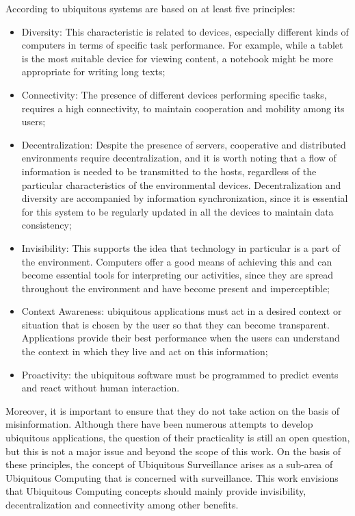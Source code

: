 According to \cite{Hansmann2001} ubiquitous systems are based on at least five principles:
\begin{itemize}

\item Diversity: This characteristic is related to devices, especially different kinds of computers in terms of specific task performance. For example, while a tablet is the most suitable device for viewing content, a notebook might be more appropriate for writing long texts;

\item Connectivity: The presence of different devices performing specific tasks, requires a high connectivity, to maintain cooperation and mobility among its users;

\item Decentralization: Despite the presence of servers, cooperative and distributed environments require decentralization, and it is worth noting that a flow of information is needed to be transmitted to the hosts, regardless of the particular characteristics of the environmental devices. Decentralization and diversity are accompanied by information synchronization, since it is essential for this system to be regularly updated in all the devices to maintain data consistency;

\item Invisibility: This supports the idea that technology in particular is a part of the environment. Computers offer a good means of achieving this and can become essential tools for interpreting our activities, since they are spread throughout the environment and have become present and imperceptible;

\item Context Awareness: ubiquitous applications must act in a desired context or situation that is chosen by the user so that they can become transparent. Applications provide their best performance when the users can understand the context in which they live and act on this information;

\item Proactivity: the ubiquitous software must be programmed to predict events and react without human interaction. 
\end{itemize}
Moreover, it is important to ensure that they do not take action on the basis of misinformation.
Although there have been numerous attempts to develop ubiquitous applications, the question of their practicality is still an open question, but this is not a major issue and beyond the scope of this work. On the basis of these principles, the concept of Ubiquitous Surveillance arises \cite{Orwel42} as a sub-area of Ubiquitous Computing that is concerned with surveillance. This work envisions that Ubiquitous Computing concepts should mainly provide invisibility, decentralization and connectivity among other benefits.


